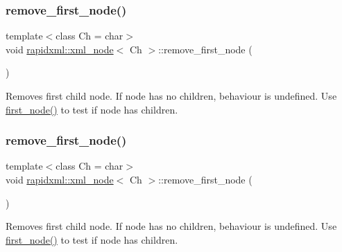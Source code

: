 \subsubsection{\texorpdfstring{remove\+\_\+first\+\_\+node()}{remove\_first\_node()}\hspace{0.1cm}{\footnotesize\ttfamily [1/2]}}
{\footnotesize\ttfamily template$<$class Ch = char$>$ \\
void \mbox{\hyperlink{classrapidxml_1_1xml__node}{rapidxml\+::xml\+\_\+node}}$<$ Ch $>$\+::remove\+\_\+first\+\_\+node (\begin{DoxyParamCaption}{ }\end{DoxyParamCaption})\hspace{0.3cm}{\ttfamily [inline]}}

Removes first child node. If node has no children, behaviour is undefined. Use \mbox{\hyperlink{classrapidxml_1_1xml__node_acdf3691224d683f50692616a92a75d3f}{first\+\_\+node()}} to test if node has children. \mbox{\label{classrapidxml_1_1xml__node_a62bf7b276cf7a651a3337f5e0a0ef6ac}} 
\subsubsection{\texorpdfstring{remove\+\_\+first\+\_\+node()}{remove\_first\_node()}\hspace{0.1cm}{\footnotesize\ttfamily [2/2]}}
{\footnotesize\ttfamily template$<$class Ch = char$>$ \\
void \mbox{\hyperlink{classrapidxml_1_1xml__node}{rapidxml\+::xml\+\_\+node}}$<$ Ch $>$\+::remove\+\_\+first\+\_\+node (\begin{DoxyParamCaption}{ }\end{DoxyParamCaption})\hspace{0.3cm}{\ttfamily [inline]}}

Removes first child node. If node has no children, behaviour is undefined. Use \mbox{\hyperlink{classrapidxml_1_1xml__node_acdf3691224d683f50692616a92a75d3f}{first\+\_\+node()}} to test if node has children. \mbox{\label{classrapidxml_1_1xml__node_a1781a2cbedc9a51d609ad5b528125635}} 
